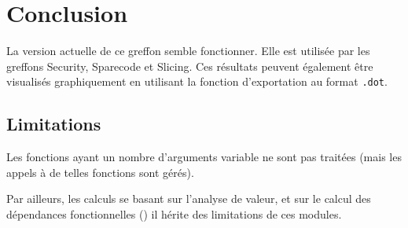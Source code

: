 \chapter{Conclusion}

La version actuelle de ce greffon semble fonctionner.
Elle est utilisée par les greffons {\sc Security}, {\sc Sparecode} et
{\sc Slicing}. Ces résultats peuvent également être visualisés
graphiquement en utilisant la fonction d'exportation
au format {\tt .dot}.\\

\section{Limitations}

Les fonctions ayant un nombre d'arguments variable
ne sont pas traitées (mais les appels à de telles fonctions sont gérés).

Par ailleurs, les calculs se basant sur l'analyse de valeur,
et sur le calcul des dépendances fonctionnelles (\from)
il hérite des limitations de ces modules.
